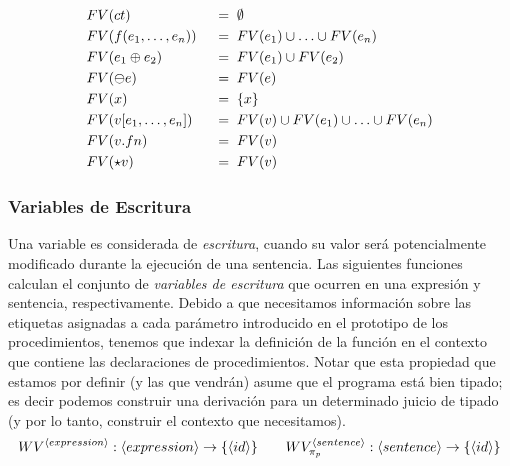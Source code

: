 
\begin{alignat*}{2}
&FV(ct)
&&\;=\;
\emptyset
\\
&FV(f(e_1, \ldots, e_n))
&&\;=\;
FV(e_1) \cup \ldots \cup FV(e_n)
\\
&FV(e_1 \oplus e_2)
&&\;=\;
FV(e_1) \cup FV(e_2)
\\
&FV(\ominus e)
&&\;=\;
FV(e)
\\
&FV(x)
&&\;=\;
\{ x \}
\\
&FV(v [e_1, \ldots, e_n])
&&\;=\;
FV(v) \cup FV(e_1) \cup \ldots \cup FV(e_n)
\\
&FV(v.fn)
&&\;=\;
FV(v)
\\
&FV(\star v)
&&\;=\;
FV(v)
\end{alignat*}

\subsubsection{Variables de Escritura}

Una variable es considerada de \textit{escritura}, cuando su valor será potencialmente modificado durante la ejecución de una sentencia.
Las siguientes funciones calculan el conjunto de \textit{variables de escritura} que ocurren en una expresión y sentencia, respectivamente.
Debido a que necesitamos información sobre las etiquetas asignadas a cada parámetro introducido en el prototipo de los procedimientos, tenemos que
indexar la definición de la función en el contexto que contiene las declaraciones de procedimientos. Notar que esta propiedad que estamos por definir (y las que vendrán) asume que el programa está bien tipado; es decir podemos construir una derivación para un determinado juicio de tipado (y por lo tanto, construir el contexto que necesitamos). 
\begin{gather*}
WV^{\langle expression \rangle}: \langle expression \rangle \rightarrow \{ \langle id \rangle \}
\qquad
WV^{\langle sentence \rangle}_{\pi_{p}}: \langle sentence \rangle \rightarrow \{ \langle id \rangle \}
\end{gather*}

